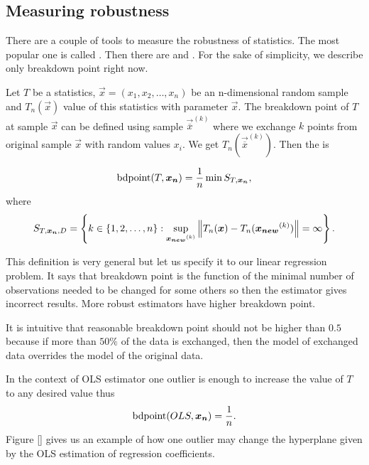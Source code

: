\subsection{Measuring robustness}
There are a couple of tools to measure the robustness of statistics. The most popular one is called . Then there are  and . For the sake of simplicity, we describe only breakdown point right now. 

\begin{definition}
    Let $T$ be a statistics, $\vec{x} = (x_1, x_2,\ldots,x_n)$ be an n-dimensional random sample and $T_n(\vec{x})$ value of this statistics with parameter $\vec{x}$. The breakdown point of $T$ at sample $\vec{x}$ can be defined using sample $\vec{\overline{x}}^{(k)}$ where we exchange $k$ points from original sample $\vec{x}$ with random values $x_i$. We get $T_n(\vec{\overline{x}}^{(k)})$. Then the  is 

\begin{equation}
    \operatorname{bdpoint}(T,\boldsymbol{x_n} ) = \frac{1}{n} \min S_{T, \boldsymbol{x_n}} , 
\end{equation}
where 
\begin{equation}
   S_{T, \boldsymbol{x_n}, D} = 
  \left\{ k \in \{{1,2, \ldots ,n\}} : \sup_{ \boldsymbol{x_{new}}^{(k)} } \left\lVert T_n(\boldsymbol{x}) - T_n(\boldsymbol{x_{new}}^{(k)})\right\rVert = \infty   \right\}.  
\end{equation}
\end{definition}

This definition is very general but let us specify it to our linear regression problem. It says that breakdown point is the function of the minimal number of observations needed to be changed for some others so then the estimator gives incorrect results. More robust estimators have higher breakdown point. 

It is intuitive that reasonable breakdown point should not be higher than $0.5$ \cite{rouss:1986} because if more than $50\%$ of the data is exchanged, then the model of exchanged data overrides the model of the original data. 

In the context of OLS estimator one outlier is enough to increase the value of $T$ to any desired value \cite{agullo2001new} thus 
\begin{equation}
    \operatorname{bdpoint}(OLS,\boldsymbol{x_n} ) = \frac{1}{n}.
\end{equation}
Figure [] gives us an example of how one outlier may change the hyperplane given by the OLS estimation of regression coefficients.

